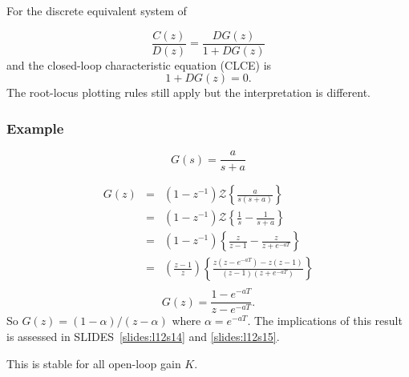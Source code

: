 For the discrete equivalent system of 

$$\frac{C(z)}{D(z)} = \frac{DG(z)}{1+DG(z)}$$ and the closed-loop characteristic equation (CLCE) is $$1+DG(z)=0.$$ The root-locus plotting rules still apply but the interpretation is different.

\subsubsection*{Example}

$$G(s)=\frac{a}{s+a}$$

\begin{eqnarray*}
	G(z) & = & (1-z^{-1})\mathcal{Z}\left\{\frac{a}{s(s+a)}\right\} \\
	     & = & (1-z^{-1})\mathcal{Z}\left\{\frac{1}{s}-\frac{1}{s+a}\right\} \\
	     & = & (1-z^{-1})\left\{\frac{z}{z-1}-\frac{z}{z+e^{-aT}}\right\} \\
		 & = & \left(\frac{z-1}{z}\right)\left\{\frac{z(z-e^{-aT})-z(z-1)}{(z-1)(z+e^{-aT})}\right\} \\
\end{eqnarray*}
$$G(z) = \frac{1-e^{-aT}}{z-e^{-aT}}.$$
So $G(z)=(1-\alpha)/(z-\alpha)$ where $\alpha=e^{-aT}$. The implications of this result is assessed in SLIDES~\ref{slides:l12s14} and \ref{slides:l12s15}.
\begin{slide}\label{slides:l12s14}
	\begin{center}
	\end{center}
	This is stable for all open-loop gain $K$.
\end{slide}
